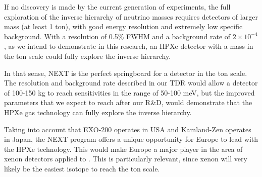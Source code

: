 
If no discovery is made by the current generation of experiments, the full exploration of the inverse hierarchy of neutrino masses requires detectors of larger mass (at least 1 ton), with good energy resolution and extremely low specific background. With a resolution of 0.5\% FWHM and a background rate of $2 \times 10^{-4}$\ckky, as we intend to demonstrate in this research, an HPXe detector with a mass in the ton scale could fully explore the inverse hierarchy. %

In that sense, NEXT is the perfect springboard for a detector in the ton scale. The resolution and background rate described in our TDR would allow a detector of 100-150 kg to reach sensitivities in the range of 50-100 meV, but the improved parameters that we expect to reach after our R\&D, would demonstrate that the HPXe gas technology can fully explore the inverse hierarchy. 

Taking into account that EXO-200 operates in USA and Kamland-Zen operates in Japan, the NEXT program offers a unique opportunity for Europe to lead with the HPXe technology. This would make Europe a major player in the area of xenon detectors applied to \bbonu. This is particularly relevant, since xenon will very likely be the easiest isotope to reach the ton scale.
 
